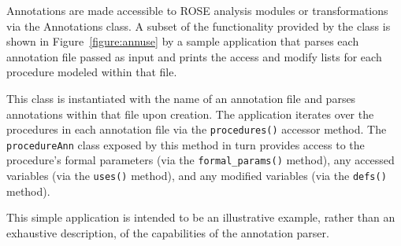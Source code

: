 \documentclass[times, 10pt]{article}
\begin{document}
Annotations are made accessible to ROSE analysis modules or
transformations via the Annotations class.  A subset of the functionality 
provided by the  class is shown in 
Figure~\ref{figure:annuse} by a sample application
that parses each annotation file passed as input and prints 
the access and modify lists for each procedure modeled within that file.

This class is instantiated with the name of an annotation file and 
parses annotations within that file upon creation.  The application
iterates over the procedures in each annotation file via the 
{\tt procedures()} accessor method.  The {\tt procedureAnn} class exposed by
this method in turn provides access to the procedure's formal parameters
(via the {\tt formal\_params()} method), any accessed variables 
(via the {\tt uses()} method), and any modified variables 
(via the {\tt defs()} method).

This simple application is intended to be an illustrative example,
rather than an exhaustive description, of the capabilities of the
annotation parser.
\end{document}
